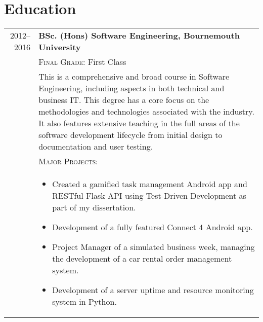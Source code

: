 \section{Education}\label{sec:education}
\begin{tabular}{r|p{11cm}}
    2012--2016 & \textbf{BSc. (Hons) Software Engineering, Bournemouth University}\\
    & \textsc{Final Grade}: First Class \\
    & \small This is a comprehensive and broad course in Software Engineering, including aspects in both technical and business IT. This degree has a core focus on the methodologies and technologies associated with the industry.
    It also features extensive teaching in the full areas of the software development lifecycle from initial design to documentation and user testing. \\
    & \vspace{1pt} \textsc{Major Projects}: \\
    & \vspace{-0.9em}\begin{itemize}[itemsep=0pt,topsep=0pt,leftmargin=*]
                         \small
                         \item Created a gamified task management Android app and RESTful Flask API using Test-Driven Development as part of my dissertation.
                         \item Development of a fully featured Connect 4 Android app.
                         \item Project Manager of a simulated business week, managing the development of a car rental order management system.
                         \item Development of a server uptime and resource monitoring system in Python.
    \end{itemize}\vspace{-1.5em}

\end{tabular}
